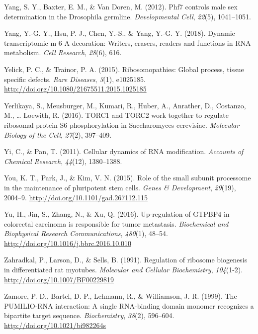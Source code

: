 \documentclass[12pt,twoside]{reedthesis}
\newlength{\cslhangindent}
\newenvironment{cslreferences}%
  {\setlength{\parindent}{0pt}%
  \everypar{\setlength{\hangindent}{\cslhangindent}}\ignorespaces}%
  {\par}
\begin{document}
\begin{cslreferences}
\leavevmode\hypertarget{ref-Yang2012}{}%
Yang, S. Y., Baxter, E. M., \& Van Doren, M. (2012). Phf7 controls male sex determination in the Drosophila germline. \emph{Developmental Cell}, \emph{22}(5), 1041--1051.

\leavevmode\hypertarget{ref-Yang2018}{}%
Yang, Y.-G. Y., Hsu, P. J., Chen, Y.-S., \& Yang, Y.-G. Y. (2018). Dynamic transcriptomic m 6 A decoration: Writers, erasers, readers and functions in RNA metabolism. \emph{Cell Research}, \emph{28}(6), 616.

\leavevmode\hypertarget{ref-Yelick2015a}{}%
Yelick, P. C., \& Trainor, P. A. (2015). Ribosomopathies: Global process, tissue specific defects. \emph{Rare Diseases}, \emph{3}(1), e1025185. \url{http://doi.org/10.1080/21675511.2015.1025185}

\leavevmode\hypertarget{ref-Yerlikaya2016a}{}%
Yerlikaya, S., Meusburger, M., Kumari, R., Huber, A., Anrather, D., Costanzo, M., \ldots{} Loewith, R. (2016). TORC1 and TORC2 work together to regulate ribosomal protein S6 phosphorylation in Saccharomyces cerevisiae. \emph{Molecular Biology of the Cell}, \emph{27}(2), 397--409.

\leavevmode\hypertarget{ref-Yi2011}{}%
Yi, C., \& Pan, T. (2011). Cellular dynamics of RNA modification. \emph{Accounts of Chemical Research}, \emph{44}(12), 1380--1388.

\leavevmode\hypertarget{ref-You2015}{}%
You, K. T., Park, J., \& Kim, V. N. (2015). Role of the small subunit processome in the maintenance of pluripotent stem cells. \emph{Genes \& Development}, \emph{29}(19), 2004--9. \url{http://doi.org/10.1101/gad.267112.115}

\leavevmode\hypertarget{ref-yuUpregulationGTPBP4Colorectal2016}{}%
Yu, H., Jin, S., Zhang, N., \& Xu, Q. (2016). Up-regulation of GTPBP4 in colorectal carcinoma is responsible for tumor metastasis. \emph{Biochemical and Biophysical Research Communications}, \emph{480}(1), 48--54. \url{http://doi.org/10.1016/j.bbrc.2016.10.010}

\leavevmode\hypertarget{ref-zahradkalRegulationRibosomeBiogenesis1991}{}%
Zahradkal, P., Larson, D., \& Sells, B. (1991). Regulation of ribosome biogenesis in differentiated rat myotubes. \emph{Molecular and Cellular Biochemistry}, \emph{104}(1-2). \url{http://doi.org/10.1007/BF00229819}

\leavevmode\hypertarget{ref-Zamore1999b}{}%
Zamore, P. D., Bartel, D. P., Lehmann, R., \& Williamson, J. R. (1999). The PUMILIO-RNA interaction: A single RNA-binding domain monomer recognizes a bipartite target sequence. \emph{Biochemistry}, \emph{38}(2), 596--604. \url{http://doi.org/10.1021/bi982264s}


\end{cslreferences}
\end{document}
